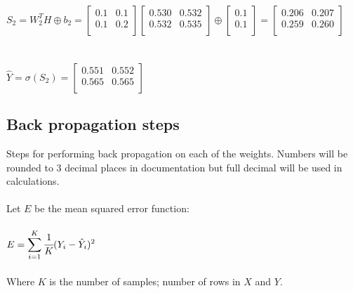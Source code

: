 \documentclass{article}
\begin{document}
\\$S_2 = W_2^TH \oplus b_2 =
\begin{bmatrix}
0.1 & 0.1 \\
0.1 & 0.2 \\
\end{bmatrix}
\begin{bmatrix}
0.530 & 0.532 \\
0.532 & 0.535 \\
\end{bmatrix} \oplus
\begin{bmatrix}
0.1 \\
0.1 \\
\end{bmatrix}
=
\begin{bmatrix}
0.206 & 0.207 \\
0.259 & 0.260 \\
\end{bmatrix}$\\
\\
\\$\hat{Y} = \sigma(S_2) =
\begin{bmatrix}
0.551 & 0.552 \\
0.565 & 0.565 \\
\end{bmatrix}$
\clearpage

\subsection{Back propagation steps}
Steps for performing back propagation on each of the weights. Numbers will be
rounded to 3 decimal places in documentation but full decimal will be used in
calculations.\\
\\Let $E$ be the mean squared error function:\\
\\$E = \displaystyle \sum_{i=1}^{K}\cfrac{1}{K}(Y_i-\hat{Y}_i)^2$\\\\ Where $K$ is the number of samples; number of rows in $X$ and $Y$.\\
\end{document}
